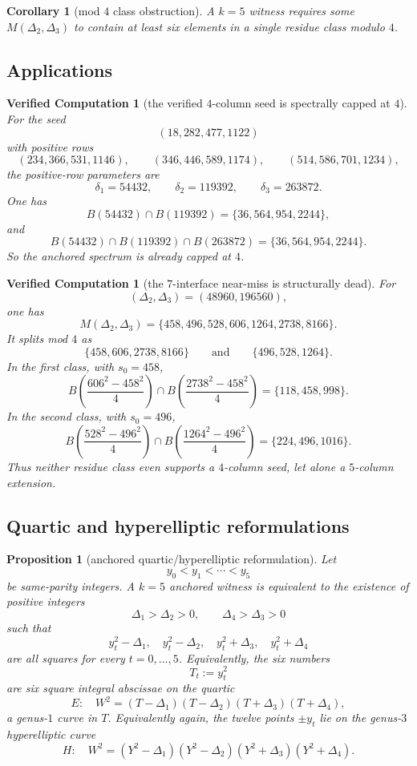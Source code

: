 \documentclass[11pt]{article}
\theoremstyle{plainbreak}
\newtheorem{proposition}[theorem]{Proposition}
\newtheorem{corollary}[theorem]{Corollary}
\theoremstyle{defbreak}
\newtheorem{computation}[theorem]{Verified Computation}
\newcommand{\Bset}{B}
\newcommand{\Mset}{M}
\begin{document}
\begin{corollary}[mod $4$ class obstruction]
A $k=5$ witness requires some $\Mset(\Delta_2,\Delta_3)$ to contain at least six elements in a single residue class modulo $4$.
\end{corollary}

\subsection{Applications}

\begin{computation}[the verified $4$-column seed is spectrally capped at $4$]
For the seed
\[
(18,282,477,1122)
\]
with positive rows
\[
(234,366,531,1146),\qquad
(346,446,589,1174),\qquad
(514,586,701,1234),
\]
the positive-row parameters are
\[
\delta_1=54432,\qquad
\delta_2=119392,\qquad
\delta_3=263872.
\]
One has
\[
\Bset(54432)\cap \Bset(119392)=\{36,564,954,2244\},
\]
and
\[
\Bset(54432)\cap \Bset(119392)\cap \Bset(263872)=\{36,564,954,2244\}.
\]
So the anchored spectrum is already capped at $4$.
\end{computation}

\begin{computation}[the $7$-interface near-miss is structurally dead]
For
\[
(\Delta_2,\Delta_3)=(48960,196560),
\]
one has
\[
\Mset(\Delta_2,\Delta_3)=\{458,496,528,606,1264,2738,8166\}.
\]
It splits mod $4$ as
\[
\{458,606,2738,8166\}\qquad\text{and}\qquad \{496,528,1264\}.
\]
In the first class, with $s_0=458$,
\[
\Bset\!\left(\frac{606^2-458^2}{4}\right)\cap
\Bset\!\left(\frac{2738^2-458^2}{4}\right)
=
\{118,458,998\}.
\]
In the second class, with $s_0=496$,
\[
\Bset\!\left(\frac{528^2-496^2}{4}\right)\cap
\Bset\!\left(\frac{1264^2-496^2}{4}\right)
=
\{224,496,1016\}.
\]
Thus neither residue class even supports a $4$-column seed, let alone a $5$-column extension.
\end{computation}

\subsection{Quartic and hyperelliptic reformulations}

\begin{proposition}[anchored quartic/hyperelliptic reformulation]
Let
\[
y_0<y_1<\cdots<y_5
\]
be same-parity integers. A $k=5$ anchored witness is equivalent to the existence of positive integers
\[
\Delta_1>\Delta_2>0,\qquad \Delta_4>\Delta_3>0
\]
such that
\[
y_t^2-\Delta_1,\quad
y_t^2-\Delta_2,\quad
y_t^2+\Delta_3,\quad
y_t^2+\Delta_4
\]
are all squares for every $t=0,\dots,5$.
Equivalently, the six numbers
\[
T_t:=y_t^2
\]
are six square integral abscissae on the quartic
\[
E:\quad W^2=(T-\Delta_1)(T-\Delta_2)(T+\Delta_3)(T+\Delta_4),
\]
a genus-$1$ curve in $T$.  Equivalently again, the twelve points $\pm y_t$ lie on the genus-$3$ hyperelliptic curve
\[
H:\quad W^2=(Y^2-\Delta_1)(Y^2-\Delta_2)(Y^2+\Delta_3)(Y^2+\Delta_4).
\]
\end{proposition}
\end{document}
